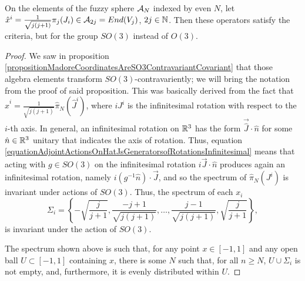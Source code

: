 \begin{proposition}\label{propositionMadoreCoordinatesAreSO3ContravariantCovariant}
On the elements of the fuzzy sphere $\mathcal A_N$ indexed by even $N$, let $\hat x^i = \frac{1}{\sqrt{j(j+1)}}\pi_j(J_i) \in \mathcal A_{2j} = End(V_j)$, $2j \in \mathbb{N}$. Then these operators satisfy the criteria, but for the group $SO(3)$ instead of $O(3)$.
\end{proposition}
\begin{proof}
 We saw in proposition \ref{propositionMadoreCoordinatesAreSO3ContravariantCovariant} that those algebra elements transform $SO(3)$-contravariently; we will bring the notation from the proof of said proposition. This was basically derived from the fact that $\hat x ^i = \frac{1}{\sqrt{j(j+1)}} \hat \pi_N(\hat J^i)$, where $iJ^i$ is the infinitesimal rotation with respect to the $i$-th axis. In general, an infinitesimal rotation on $\mathbb{R}^3$ has the form $\vec{\hat J} \cdot \hat n$ for some $\hat n \in \mathbb{R}^3$ unitary that indicates the axis of rotation. Thus, equation \eqref{equationAdjointActionsOnHatJsGeneratorsofRotationsInfinitesimal} means that acting with $g \in SO(3)$ on the infinitesimal rotation $i \vec J \cdot \hat n$ produces again an infinitesimal rotation, namely $i (g^{-1} \hat n)\cdot \vec J$, and so the spectrum of $\hat \pi_N(J^i)$ is invariant under actions of $SO(3)$. Thus, the spectrum of each $x_i$ \begin{equation*}
     \Sigma_i = \left\{-\sqrt{\frac{j}{j+1}}, \frac{-j+1}{\sqrt{j(j+1)}}, \dots, \frac{j-1}{\sqrt{j(j+1)}},  \sqrt{\frac{j}{j+1}}\right\},
 \end{equation*} is invariant under the action of $SO(3)$. 
 
 The spectrum shown above is such that, for any point $x \in [-1, 1]$ and any open ball $U \subset [-1, 1]$ containing $x$, there is some $N$ such that, for all $n \geq N$, $U \cup \Sigma_i$ is not empty, and, furthermore, it is evenly distributed within $U$.
 
\end{proof}

